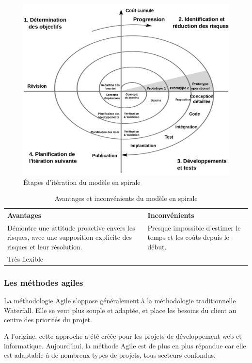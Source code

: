 \documentclass[a4paper, 12pt]{report}
\begin{document}
\begin{figure}[H]
    \centering
    \includegraphics[width = 1\linewidth]{img/model-spirale.png}
    \caption{Étapes d’itération du modèle en spirale}
\end{figure}
\begin{table}[H]
\begin{tabular}{|p{6cm}|p{6cm}|} 
\hline  
\centering \textbf{Avantages} & \raggedright  \textbf{Inconvénients} \tabularnewline  
\hline
\raggedright Démontre une attitude proactive envers les risques, avec une supposition explicite des risques et leur résolution.  &  Presque impossible d'estimer le temps et les coûts depuis le début.   \tabularnewline  
\hline  
\raggedright Très flexible  &  \tabularnewline
\hline
\end{tabular}
\caption{Avantages et inconvénients du modèle en spirale}
\end{table}

\subsubsection{Les méthodes agiles }
La méthodologie Agile s'oppose généralement à la méthodologie traditionnelle Waterfall. Elle se veut plus souple et adaptée, et place les besoins du client au centre des priorités du projet. 

A l'origine, cette approche a été créée pour les projets de développement web et informatique. Aujourd'hui, la méthode Agile est de plus en plus répandue car elle est adaptable à de nombreux types de projets, tous secteurs confondus. 
\end{document}
